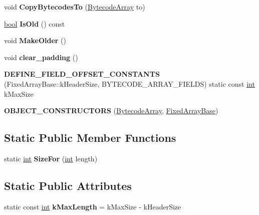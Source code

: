 \begin{DoxyCompactItemize}
void {\bfseries Copy\+Bytecodes\+To} (\mbox{\hyperlink{classv8_1_1internal_1_1BytecodeArray}{Bytecode\+Array}} to)
\item 
\mbox{\label{classv8_1_1internal_1_1BytecodeArray_ae79138016438708e482161fa6fd86da7}} 
\mbox{\hyperlink{classbool}{bool}} {\bfseries Is\+Old} () const
\item 
\mbox{\label{classv8_1_1internal_1_1BytecodeArray_ac95fd2413fa6e4cc9bb539178480a85f}} 
void {\bfseries Make\+Older} ()
\item 
\mbox{\label{classv8_1_1internal_1_1BytecodeArray_a8aaca6fef1dbb7c590eef04265fdcd6d}} 
void {\bfseries clear\+\_\+padding} ()
\item 
\mbox{\label{classv8_1_1internal_1_1BytecodeArray_a17bb7d251c65848703e0e9f2690863a5}} 
{\bfseries D\+E\+F\+I\+N\+E\+\_\+\+F\+I\+E\+L\+D\+\_\+\+O\+F\+F\+S\+E\+T\+\_\+\+C\+O\+N\+S\+T\+A\+N\+TS} (Fixed\+Array\+Base\+::k\+Header\+Size, B\+Y\+T\+E\+C\+O\+D\+E\+\_\+\+A\+R\+R\+A\+Y\+\_\+\+F\+I\+E\+L\+DS) static const \mbox{\hyperlink{classint}{int}} k\+Max\+Size
\item 
\mbox{\label{classv8_1_1internal_1_1BytecodeArray_afff237456da558b6bcfe25d2f038fe37}} 
{\bfseries O\+B\+J\+E\+C\+T\+\_\+\+C\+O\+N\+S\+T\+R\+U\+C\+T\+O\+RS} (\mbox{\hyperlink{classv8_1_1internal_1_1BytecodeArray}{Bytecode\+Array}}, \mbox{\hyperlink{classv8_1_1internal_1_1FixedArrayBase}{Fixed\+Array\+Base}})
\end{DoxyCompactItemize}
\subsection*{Static Public Member Functions}
\begin{DoxyCompactItemize}
\item 
\mbox{\label{classv8_1_1internal_1_1BytecodeArray_ac3a55b15152573add7b487ea3839b277}} 
static \mbox{\hyperlink{classint}{int}} {\bfseries Size\+For} (\mbox{\hyperlink{classint}{int}} length)
\end{DoxyCompactItemize}
\subsection*{Static Public Attributes}
\begin{DoxyCompactItemize}
\item 
\mbox{\label{classv8_1_1internal_1_1BytecodeArray_a9b306a4048c3a924e49ff1e4bb02bfe6}} 
static const \mbox{\hyperlink{classint}{int}} {\bfseries k\+Max\+Length} = k\+Max\+Size -\/ k\+Header\+Size
\end{DoxyCompactItemize}
